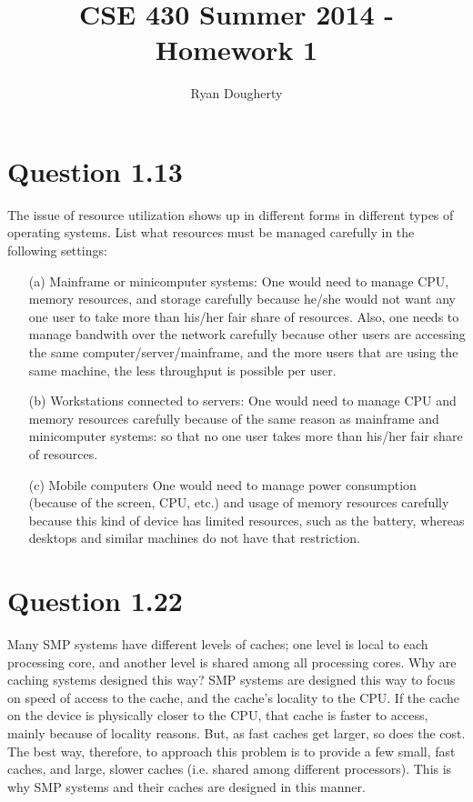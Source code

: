 \documentclass[12pt]{article}
\title{CSE 430 Summer 2014 - Homework 1}
\author{Ryan Dougherty}
\date{}                                           %
\begin{document}
\maketitle

\section*{Question 1.13} {\color{blue}The issue of resource utilization shows up in different forms in different types of operating systems. List what resources must be managed carefully in the following settings:
\begin{enumerate} 
\item[(a)] Mainframe or minicomputer systems: {\color{black}One would need to manage CPU, memory resources, and storage carefully because he/she would not want any one user to take more than his/her fair share of resources. Also, one needs to manage bandwith over the network carefully because other users are accessing the same computer/server/mainframe, and the more users that are using the same machine, the less throughput is possible per user.}

\item[(b)] Workstations connected to servers: {\color{black}One would need to manage CPU and memory resources carefully because of the same reason as mainframe and minicomputer systems: so that no one user takes more than his/her fair share of resources.}

\item[(c)] Mobile computers {\color{black}One would need to manage power consumption (because of the screen, CPU, etc.) and usage of memory resources carefully because this kind of device has limited resources, such as the battery, whereas desktops and similar machines do not have that restriction.}
\end{enumerate}
}

\section*{Question 1.22} {\color{blue}Many SMP systems have different levels of caches; one level is local to each processing core, and another level is shared among all processing cores. Why are caching systems designed this way?}
SMP systems are designed this way to focus on speed of access to the cache, and the cache's locality to the CPU. If the cache on the device is physically closer to the CPU, that cache is faster to access, mainly because of locality reasons. But, as fast caches get larger, so does the cost. The best way, therefore, to approach this problem is to provide a few small, fast caches, and large, slower caches (i.e. shared among different processors). This is why SMP systems and their caches are designed in this manner. 
\end{document}
